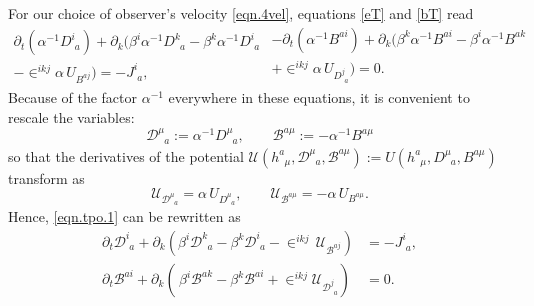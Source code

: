 \documentclass[
10pt, %
a4paper, %
oneside, %
twocolumn,
headinclude,footinclude, %
BCOR5mm, %
]{scrartcl}
\newcommand{\pd}[1]{\partial_{#1}}
\newcommand{\tetrsymbol}{h}
\newcommand{\tetr}[2]{\tetrsymbol^{#1}_{\phantom{#1}#2}}
\newcommand{\Dm}[2]{D_{\phantom{#2}#1}^{#2}}	%
\newcommand{\aD}[2]{\mathcal{D}_{\phantom{#2}#1}^{#2}}	%
\newcommand{\Bm}[2]{B^{#1#2}}	%
\newcommand{\aB}[2]{\mathcal{B}^{#1#2}}	%
\newcommand{\Um}{U}%
\newcommand{\aU}{\mathcal{U}}%
\newcommand{\LCsymb}{\bm{\in}}    %
\newcommand{\NC}[2]{J^{#2}_{\phantom{#2}#1}}
\newcommand{\lapse}{\alpha}
\newcommand{\shift}[1]{\beta^{#1}}
\begin{document}
	For our choice of observer's velocity \eqref{eqn.4vel}, equations \eqref{eT} 
	and \eqref{bT} read
	\begin{subequations}\label{eqn.tpo.1}
		\begin{multline}
			\pd{t} (\lapse^{-1}\Dm{a}{i}) + \pd{k}(\shift{i} 
			\lapse^{-1}\Dm{a}{k} - \shift{k}\lapse^{-1}\Dm{a}{i} \\
			- \LCsymb^{ikj} \lapse \,
			\Um_{\Bm{a}{j}}) 
			= -\NC{a}{i},
		\end{multline}
		\begin{multline}
			-\pd{t} (\lapse^{-1}\Bm{a}{i}) + \pd{k}(\shift{k} 
			\lapse^{-1}\Bm{a}{i} - \shift{i}\lapse^{-1}\Bm{a}{k}  \\
			+ \LCsymb^{ikj} \lapse \,
			\Um_{\Dm{a}{j}}) 
			= 0 .
		\end{multline}
	\end{subequations}
	Because of the factor $ \alpha^{-1} $ everywhere in these equations, it is convenient to 
	rescale 
	the 
	variables:
	\begin{equation}\label{eqn.varDB}
		\aD{a}{\mu} := \lapse^{-1} \Dm{a}{\mu}, \qquad \aB{a}{\mu} := -\lapse^{-1}\Bm{a}{\mu}
	\end{equation}
	so that the derivatives of the potential $ \aU(\tetr{a}{\mu},\aD{a}{\mu},\aB{a}{\mu}) := 
	\Um(\tetr{a}{\mu},\Dm{a}{\mu},\Bm{a}{\mu})
	$ 
	transform as
	\begin{equation}\label{eqn.change.alphaU}
		\aU_{\aD{a}{\mu}} =  \lapse \, \Um_{\Dm{a}{\mu}},
		\qquad
		\aU_{\aB{a}{\mu}} = -\lapse \, \Um_{\Bm{a}{\mu}}.
	\end{equation}
	Hence, \eqref{eqn.tpo.1} can be rewritten as
	\begin{subequations}\label{eqn.tpo.2}
		\begin{align}
			\pd{t} \aD{a}{i} + \pd{k}(\shift{i} 
			\aD{a}{k} - \shift{k}\aD{a}{i}  - \LCsymb^{ikj} \,
			\aU_{\aB{a}{j}}) & 
			= -\NC{a}{i},\\[2mm]
			\pd{t} \aB{a}{i} + \pd{k}(\,\shift{i} 
			\aB{a}{k} - \shift{k}\aB{a}{i}  + \LCsymb^{ikj} 
			\aU_{\aD{a}{j}}) & 
			= 0.
		\end{align}
	\end{subequations}
	
\end{document}
